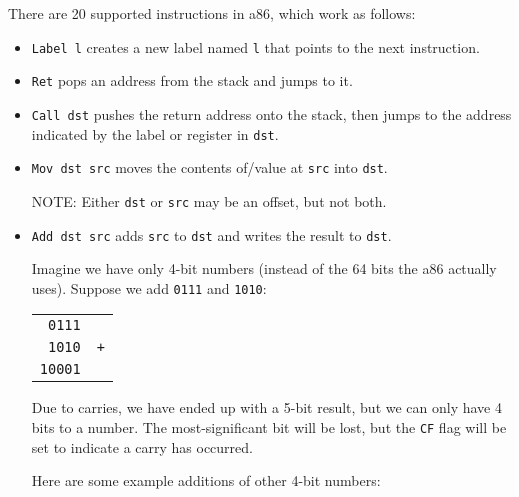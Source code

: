 \documentclass{article}
\newcommand{\lang}{a86}
\begin{document}
There are 20 supported instructions in \lang{}, which work as follows:

{\renewcommand\labelitemii{}\renewcommand\labelitemiii{}
  \begin{itemize}
  \item \texttt{Label l} creates a new label named \texttt{l} that points to the
    next instruction.
  \item \texttt{Ret} pops an address from the stack and jumps to it.
  \item \texttt{Call dst} pushes the return address onto the stack, then jumps
    to the address indicated by the label or register in \texttt{dst}.
  \item \texttt{Mov dst src} moves the contents of/value at \texttt{src} into
    \texttt{dst}.

    NOTE: Either \texttt{dst} or \texttt{src} may be an offset, but not both.
  \item \texttt{Add dst src} adds \texttt{src} to \texttt{dst} and writes the
    result to \texttt{dst}.

    Imagine we have only 4-bit numbers (instead of the 64 bits the \lang{}
    actually uses). Suppose we add \texttt{0111} and \texttt{1010}:

    \begin{center}
      \begin{tabular}{rl}
        \texttt{0111} \\
        \texttt{1010} & \texttt{+} \\
        \hline
        \texttt{10001}
      \end{tabular}
    \end{center}

    Due to carries, we have ended up with a 5-bit result, but we can only have 4
    bits to a number. The most-significant bit will be lost, but the \texttt{CF}
    flag will be set to indicate a carry has occurred.

    Here are some example additions of other 4-bit numbers:


\end{itemize}}
\end{document}

